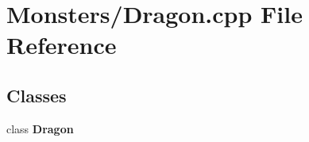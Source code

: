 \section{Monsters/\-Dragon.cpp File Reference}
\label{_dragon_8cpp}
\subsection*{Classes}
\begin{DoxyCompactItemize}
\item 
class {\bf Dragon}
\end{DoxyCompactItemize}
